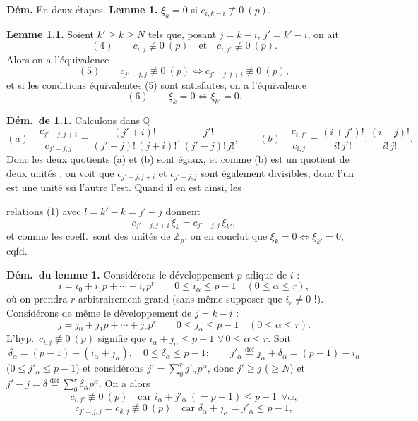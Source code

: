 \documentclass[11pt,a4paper]{article}
\begin{document}
\textbf{Dém.} En deux étapes.
\textbf{Lemme 1.}  $\xi_k = 0$ si $c_{i, k-i} \not\equiv 0 \ (p)$.

\textbf{Lemme 1.1.} Soient  $k' \geq k \geq N$ tels que, posant $j = k - i$,
$j' = k' - i$, on ait
\[
  (4) \qquad c_{i,j} \not\equiv 0 \ (p) \quad \text{et} \quad c_{i,j'} \not\equiv 0 \ (p) .
\]
Alors on a l'équivalence
\[
  (5) \qquad c_{j'-j, j} \not\equiv 0 \ (p) \iff c_{j'-j, j+i} \not\equiv 0 \ (p) ,
\]
et si les conditions équivalentes (5) sont satisfaites, on a l'équivalence
\[
  (6) \qquad \xi_k = 0 \iff \xi_{k'} = 0 .
\]

\textbf{Dém.\ de 1.1.} Calculons dans $\mathbb{Q}$
\[
  (a) \quad \frac{c_{j'-j, j+i}}{c_{j'-j, j}}
  = \frac{(j'+i)!}{(j'-j)!\,(j+i)!} : \frac{j'!}{(j'-j)!\, j!} ,
  \qquad
  (b) \quad \frac{c_{i, j'}}{c_{i, j}} = \frac{(i+j')!}{i!\, j'!} : \frac{(i+j)!}{i!\, j!} .
\]
Donc les deux quotients (a) et (b) sont égaux, et comme (b) est un quotient de deux unités
 , on voit que $c_{j'-j, j+i}$ et
$c_{j'-j, j}$ sont également divisibles, donc l'un est une unité ssi l'autre l'est. Quand il
en est ainsi, les

relations (1) avec $l = k' - k = j' - j$ donnent
\[
  c_{j'-j, j+i}\, \xi_k = c_{j'-j, j}\, \xi_{k'} ,
\]
et comme les coeff.\ sont des unités de $\mathbb{Z}_p$, on en conclut que
$\xi_k = 0 \iff \xi_{k'} = 0$, cqfd.

\textbf{Dém.\ du lemme 1.} Considérons le développement $p$-adique de $i$ :
\[
  i = i_0 + i_1 p + \cdots + i_r p^r \qquad 0 \leq i_\alpha \leq p - 1 \quad (0 \leq \alpha \leq r) ,
\]
où on prendra $r$ arbitrairement grand (sans même supposer que $i_r \neq 0$ !). Considérons de
même le développement de $j = k - i$ :
\[
  j = j_0 + j_1 p + \cdots + j_r p^r \qquad 0 \leq j_\alpha \leq p - 1 \quad (0 \leq \alpha \leq r) .
\]
L'hyp.\ $c_{i,j} \not\equiv 0 \ (p)$ signifie que $i_\alpha + j_\alpha \leq p - 1$
$\forall\, 0 \leq \alpha \leq r$. Soit \struck{\ill{}}
\[
  \delta_\alpha = (p-1) - (i_\alpha + j_\alpha) , \quad 0 \leq \delta_\alpha \leq p-1 ;
  \qquad
  j'_\alpha \overset{\text{déf}}{=} j_\alpha + \delta_\alpha = (p-1) - i_\alpha
\]
($0 \leq j'_\alpha \leq p-1$) et considérons $j' = \sum_0^r j'_\alpha p^\alpha$, donc
$j' \geq j$ ($\geq N$) et $j' - j = \delta \overset{\text{déf}}{=} \sum_0^r \delta_\alpha p^\alpha$.
On a alors 
\[
  c_{i, j'} \not\equiv 0 \ (p) \quad \text{car } i_\alpha + j'_\alpha \ (= p - 1) \leq p - 1 \ \ \forall \alpha ,
\]
\[
  c_{j'-j, j} = c_{\delta, j} \not\equiv 0 \ (p) \quad \text{car } \delta_\alpha + j_\alpha = j'_\alpha \leq p - 1 ,
\]
\end{document}
